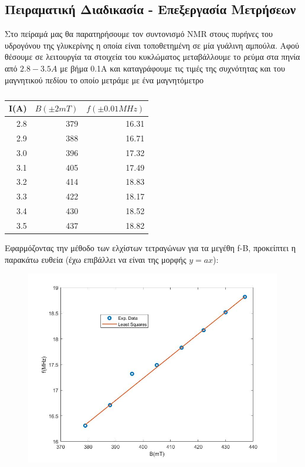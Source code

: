 \documentclass[a4paper]{article}
\begin{document}
\subsection*{Πειραματική Διαδικασία - Επεξεργασία Μετρήσεων}

	Στο πείραμά μας θα παρατηρήσουμε τον συντονισμό NMR στους πυρήνες του υδρογόνου της γλυκερίνης η οποία είναι τοποθετημένη σε μία γυάλινη αμπούλα.
	Αφού θέσουμε σε λειτουργία τα στοιχεία του κυκλώματος μεταβάλλουμε το ρεύμα στα πηνία από $2.8-3.5Α$ με βήμα 0.1Α και καταγράφουμε τις τιμές της συχνότητας και του μαγνητικού πεδίου το οποίο μετράμε με ένα μαγνητόμετρο
	\begin{table}[h!]
		\centering
		\begin{tabular}{r|r|r}
			I(A) & $B(\pm2mT)$ & $f(\pm0.01MHz)$ \\\hline\hline
			2.8& 379& 16.31\\
			2.9& 388& 16.71\\
			3.0& 396& 17.32\\
			3.1& 405& 17.49\\
			3.2& 414& 18.83\\
			3.3& 422& 18.17\\
			3.4& 430& 18.52\\
			3.5& 437& 18.82
		\end{tabular}
		\caption{ }
		\label{mat1}
	\end{table}
	
	Εφαρμόζοντας την μέθοδο των ελχίστων τετραγώνων για τα μεγέθη f-B, προκείπτει η παρακάτω ευθεία (έχω επιβάλλει να είναι της μορφής $y=ax$):
		\begin{figure}[h!]
			\centering
			\includegraphics[scale=0.4]{plot1.jpg}
			\caption{ }
			\label{im2}
		\end{figure}
		
\end{document}
